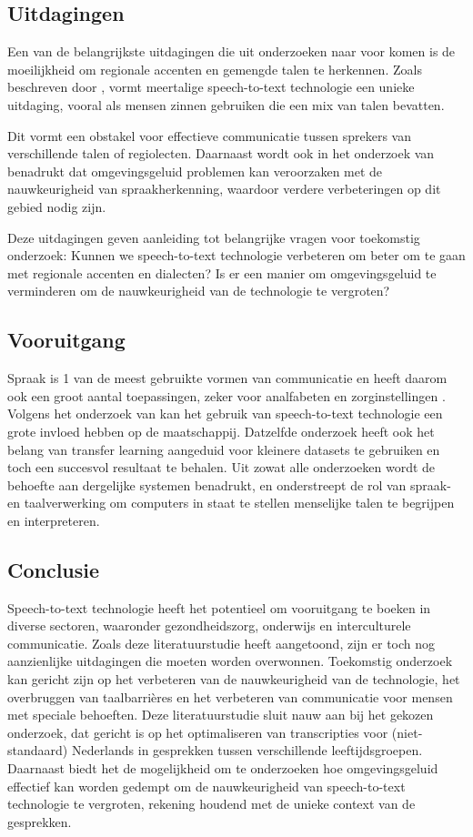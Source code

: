 \subsection{Uitdagingen}
Een van de belangrijkste uitdagingen die uit onderzoeken naar voor komen is de moeilijkheid om regionale accenten en gemengde talen te herkennen.
Zoals beschreven door \autocite{Reddy2022}, vormt meertalige speech-to-text technologie een unieke uitdaging, vooral als mensen zinnen gebruiken die een mix van talen bevatten.

Dit vormt een obstakel voor effectieve communicatie tussen sprekers van verschillende talen of regiolecten. Daarnaast wordt ook in het onderzoek van \autocite{ajami2016use} benadrukt dat omgevingsgeluid problemen kan veroorzaken met de nauwkeurigheid van spraakherkenning, waardoor verdere verbeteringen op dit gebied nodig zijn.

Deze uitdagingen geven aanleiding tot belangrijke vragen voor toekomstig onderzoek: Kunnen we speech-to-text technologie verbeteren om beter om te gaan met regionale accenten en dialecten? Is er een manier om omgevingsgeluid te verminderen om de nauwkeurigheid van de technologie te vergroten?


\subsection{Vooruitgang}
Spraak is 1 van de meest gebruikte vormen van communicatie en heeft daarom ook een groot aantal toepassingen, zeker voor analfabeten en zorginstellingen \autocite{Arun2021}. Volgens het onderzoek van \autocite{Roepke2019} kan het gebruik van speech-to-text technologie een grote invloed hebben op de maatschappij. Datzelfde onderzoek heeft ook het belang van transfer learning aangeduid voor kleinere datasets te gebruiken en toch een succesvol resultaat te behalen. Uit zowat alle onderzoeken wordt de behoefte aan dergelijke systemen benadrukt, en onderstreept de rol van spraak- en taalverwerking om computers in staat te stellen menselijke talen te begrijpen en interpreteren.

\subsection{Conclusie}
Speech-to-text technologie heeft het potentieel om vooruitgang te boeken in diverse sectoren, waaronder gezondheidszorg, onderwijs en interculturele communicatie. Zoals deze literatuurstudie heeft aangetoond, zijn er toch nog aanzienlijke uitdagingen die moeten worden overwonnen. Toekomstig onderzoek kan gericht zijn op het verbeteren van de nauwkeurigheid van de technologie, het overbruggen van taalbarrières en het verbeteren van communicatie voor mensen met speciale behoeften.
Deze literatuurstudie sluit nauw aan bij het gekozen onderzoek, dat gericht is op het optimaliseren van transcripties voor (niet-standaard) Nederlands in gesprekken tussen verschillende leeftijdsgroepen. Daarnaast biedt het de mogelijkheid om te onderzoeken hoe omgevingsgeluid effectief kan worden gedempt om de nauwkeurigheid van speech-to-text technologie te vergroten, rekening houdend met de unieke context van de gesprekken.

